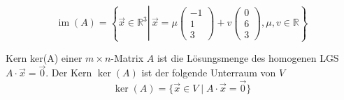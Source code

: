 \begin{example}

    $$
    \operatorname{im}(A)=\left\{\vec{x} \in \mathbb{R}^{3} \left\lvert\, \vec{x}=\mu\left(\begin{array}{c}
        -1 \\
        1 \\
        3
        \end{array}\right)+v\left(\begin{array}{l}
        0 \\
        6 \\
        3
        \end{array}\right)\right., \mu, v \in \mathbb{R}\right\}
    $$
\end{example}

\begin{definition}{Kern ker(A)}
    einer $m \times n$-Matrix $A$ ist die Lösungsmenge des homogenen LGS $A \cdot \vec{x}=\overrightarrow{0}$. Der Kern $\operatorname{ker}(A)$ ist der folgende Unterraum von $V$
    $$\operatorname{ker}(A)=\{\vec{x} \in V \mid A \cdot \vec{x}=\overrightarrow{0}\}$$
\end{definition}

